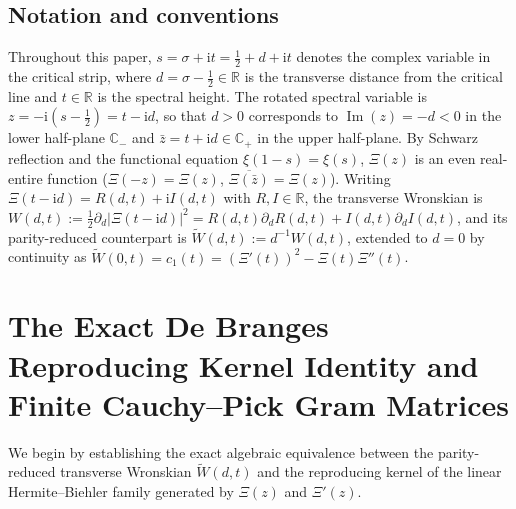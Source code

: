 \documentclass[11pt,reqno,a4paper]{amsart}
\theoremstyle{plain}
\theoremstyle{definition}
\theoremstyle{remark}
\numberwithin{equation}{section}
\newcommand{\ii}{\mathrm{i}}
\begin{document}
\subsection{Notation and conventions}\label{subsec:notation}
Throughout this paper, $s = \sigma + \ii t = \frac{1}{2} + d + \ii t$ denotes the complex variable in the critical strip, where $d = \sigma - \frac{1}{2} \in \mathbb{R}$ is the transverse distance from the critical line and $t \in \mathbb{R}$ is the spectral height. The rotated spectral variable is $z = -\ii(s - \frac{1}{2}) = t - \ii d$, so that $d > 0$ corresponds to $\operatorname{Im}(z) = -d < 0$ in the lower half-plane $\mathbb{C}_-$ and $\bar{z} = t + \ii d \in \mathbb{C}_+$ in the upper half-plane. By Schwarz reflection and the functional equation $\xi(1-s) = \xi(s)$, $\Xi(z)$ is an even real-entire function ($\Xi(-z) = \Xi(z)$, $\overline{\Xi(\bar{z})} = \Xi(z)$). Writing $\Xi(t-\ii d) = R(d,t) + \ii I(d,t)$ with $R,I \in \mathbb{R}$, the transverse Wronskian is $W(d,t) := \frac{1}{2}\partial_d|\Xi(t-\ii d)|^2 = R(d,t)\partial_d R(d,t) + I(d,t)\partial_d I(d,t)$, and its parity-reduced counterpart is $\widetilde{W}(d,t) := d^{-1}W(d,t)$, extended to $d=0$ by continuity as $\widetilde{W}(0,t) = c_1(t) = (\Xi'(t))^2 - \Xi(t)\Xi''(t)$.

\section{The Exact De Branges Reproducing Kernel Identity and Finite Cauchy--Pick Gram Matrices}\label{sec:debranges}

We begin by establishing the exact algebraic equivalence between the parity-reduced transverse Wronskian $\widetilde{W}(d,t)$ and the reproducing kernel of the linear Hermite--Biehler family generated by $\Xi(z)$ and $\Xi'(z)$.
\end{document}
